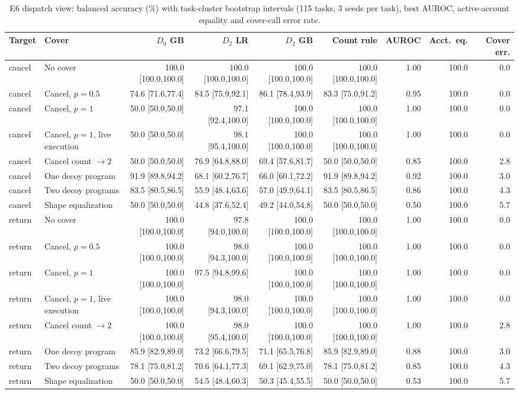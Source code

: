 \begin{table}[!ht]\centering\scriptsize
\caption{E6 dispatch view: balanced accuracy (\%) with task-cluster bootstrap intervals (115 tasks, 3 seeds per task), best AUROC, active-account equality and cover-call error rate.}
\begin{tabular}{@{}llrrrrrrr@{}}\toprule
Target & Cover & $D_0$ GB & $D_2$ LR & $D_2$ GB & Count rule & AUROC & Acct.\ eq. & Cover err.\\\midrule
cancel & No cover & 100.0 [100.0,100.0] & 100.0 [100.0,100.0] & 100.0 [100.0,100.0] & 100.0 [100.0,100.0] & 1.00 & 100.0 & 0.0\\
cancel & Cancel, $p{=}0.5$ & 74.6 [71.6,77.4] & 84.5 [75.9,92.1] & 86.1 [78.4,93.9] & 83.3 [75.0,91.2] & 0.95 & 100.0 & 0.0\\
cancel & Cancel, $p{=}1$ & 50.0 [50.0,50.0] & 97.1 [92.4,100.0] & 100.0 [100.0,100.0] & 100.0 [100.0,100.0] & 1.00 & 100.0 & 0.0\\
cancel & Cancel, $p{=}1$, live execution & 50.0 [50.0,50.0] & 98.1 [95.4,100.0] & 100.0 [100.0,100.0] & 100.0 [100.0,100.0] & 1.00 & 100.0 & 0.0\\
cancel & Cancel count $\to 2$ & 50.0 [50.0,50.0] & 76.9 [64.8,88.0] & 69.4 [57.6,81.7] & 50.0 [50.0,50.0] & 0.85 & 100.0 & 2.8\\
cancel & One decoy program & 91.9 [89.8,94.2] & 68.1 [60.2,76.7] & 66.0 [60.1,72.2] & 91.9 [89.8,94.2] & 0.92 & 100.0 & 3.0\\
cancel & Two decoy programs & 83.5 [80.5,86.5] & 55.9 [48.4,63.6] & 57.0 [49.9,64.1] & 83.5 [80.5,86.5] & 0.86 & 100.0 & 4.3\\
cancel & Shape equalization & 50.0 [50.0,50.0] & 44.8 [37.6,52.4] & 49.2 [44.0,54.8] & 50.0 [50.0,50.0] & 0.50 & 100.0 & 5.7\\
return & No cover & 100.0 [100.0,100.0] & 97.8 [94.0,100.0] & 100.0 [100.0,100.0] & 100.0 [100.0,100.0] & 1.00 & 100.0 & 0.0\\
return & Cancel, $p{=}0.5$ & 100.0 [100.0,100.0] & 98.0 [94.3,100.0] & 100.0 [100.0,100.0] & 100.0 [100.0,100.0] & 1.00 & 100.0 & 0.0\\
return & Cancel, $p{=}1$ & 100.0 [100.0,100.0] & 97.5 [94.8,99.6] & 100.0 [100.0,100.0] & 100.0 [100.0,100.0] & 1.00 & 100.0 & 0.0\\
return & Cancel, $p{=}1$, live execution & 100.0 [100.0,100.0] & 98.0 [94.3,100.0] & 100.0 [100.0,100.0] & 100.0 [100.0,100.0] & 1.00 & 100.0 & 0.0\\
return & Cancel count $\to 2$ & 100.0 [100.0,100.0] & 98.0 [95.4,100.0] & 100.0 [100.0,100.0] & 100.0 [100.0,100.0] & 1.00 & 100.0 & 2.8\\
return & One decoy program & 85.9 [82.9,89.0] & 73.2 [66.6,79.5] & 71.1 [65.5,76.8] & 85.9 [82.9,89.0] & 0.88 & 100.0 & 3.0\\
return & Two decoy programs & 78.1 [75.0,81.2] & 70.6 [64.1,77.3] & 69.1 [62.9,75.0] & 78.1 [75.0,81.2] & 0.85 & 100.0 & 4.3\\
return & Shape equalization & 50.0 [50.0,50.0] & 54.5 [48.4,60.3] & 50.3 [45.4,55.5] & 50.0 [50.0,50.0] & 0.53 & 100.0 & 5.7\\
\bottomrule\end{tabular}\end{table}

